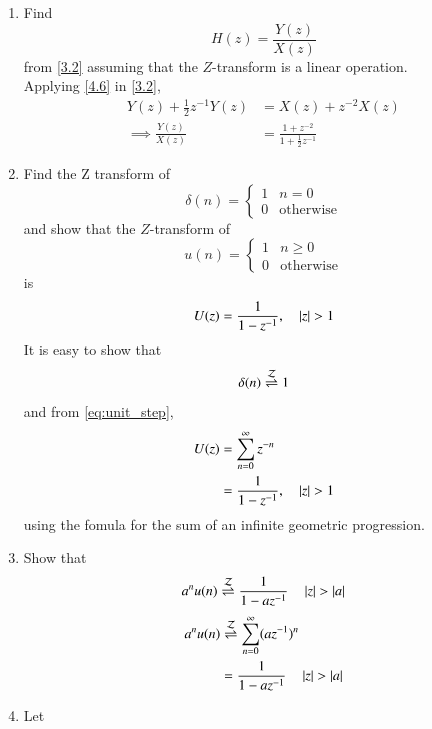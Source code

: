 \documentclass[journal,12pt,twocolumn]{IEEEtran}
\renewcommand\thesection{\arabic{section}}
\begin{document}
\begin{enumerate}[label=\thesection.\arabic*
,ref=\thesection.\theenumi]
\item Find
%
\begin{equation}\label{4.7}
H(z) = \frac{Y(z)}{X(z)}
\end{equation}
%
from  \eqref{3.2} assuming that the $Z$-transform is a linear operation.
\\
\solution  Applying \eqref{4.6} in \eqref{3.2},
\begin{align}
Y(z) + \frac{1}{2}z^{-1}Y(z) &= X(z)+z^{-2}X(z)
\\
\implies \frac{Y(z)}{X(z)} &= \frac{1 + z^{-2}}{1 + \frac{1}{2}z^{-1}}
\label{eq:freq_resp}
\end{align}
%
\item Find the Z transform of 
\begin{equation}
\delta(n)
=
\begin{cases}
1 & n = 0
\\
0 & \text{otherwise}
\end{cases}
\end{equation}
and show that the $Z$-transform of
\begin{equation}
\label{eq:unit_step}
u(n)
=
\begin{cases}
1 & n \ge 0
\\
0 & \text{otherwise}
\end{cases}
\end{equation}
is
\begin{equation}
U(z) = \frac{1}{1-z^{-1}}, \quad \left\vert z\right\vert > 1
\end{equation}
\solution It is easy to show that
\begin{equation}
\delta(n) \overset{\mathcal{Z}}{ \rightleftharpoons} 1
\end{equation}
and from \eqref{eq:unit_step},
\begin{align}
U(z) &= \sum _{n= 0}^{\infty}z^{-n}
\\
&=\frac{1}{1-z^{-1}}, \quad \left\vert z\right\vert > 1
\end{align}
using the fomula for the sum of an infinite geometric progression.
%
\item Show that 
\begin{equation}
\label{eq:anun}
a^nu(n) \overset{\mathcal{Z}}{ \rightleftharpoons} \frac{1}{1-az^{-1}} \quad \left\vert z\right\vert > \left\vert a\right\vert
\end{equation}
\solution \begin{align}
	a^nu(n) &\overset{\mathcal{Z}}{ \rightleftharpoons} \sum_{n=0}^\infty (az^{-1})^n\\
	& =\frac{1}{1-az^{-1}} \quad \left\vert z\right\vert > \left\vert a\right\vert
\end{align}
%
\item 
Let
\begin{equation}

\end{equation}
\end{enumerate}
\end{document}
